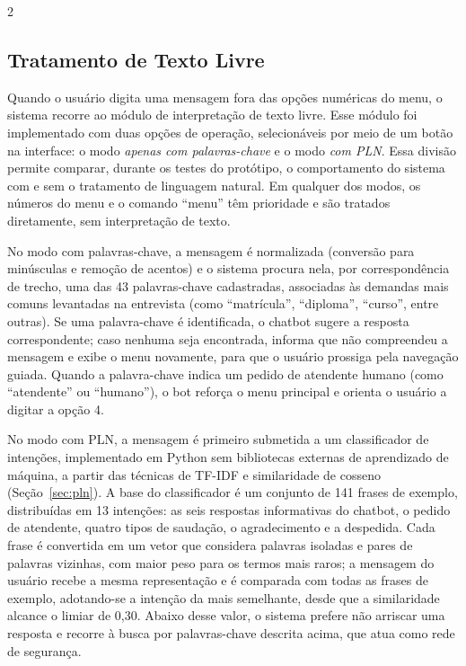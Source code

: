 \documentclass[10pt]{article}
\begin{document}
\begin{multicols}{2}


\subsection{Tratamento de Texto Livre}\label{sec:textolivre}

Quando o usuário digita uma mensagem fora das opções numéricas do menu, o
sistema recorre ao módulo de interpretação de texto livre. Esse módulo foi
implementado com duas opções de operação, selecionáveis por meio de um
botão na interface: o modo \textit{apenas com palavras-chave} e o modo
\textit{com PLN}. Essa divisão permite comparar, durante os testes do
protótipo, o comportamento do sistema com e sem o tratamento de linguagem
natural. Em qualquer dos modos, os números do menu e o comando ``menu'' têm
prioridade e são tratados diretamente, sem interpretação de texto.

No modo com palavras-chave, a mensagem é normalizada (conversão para
minúsculas e remoção de acentos) e o sistema procura nela, por
correspondência de trecho, uma das 43 palavras-chave cadastradas,
associadas às demandas mais comuns levantadas na entrevista (como
``matrícula'', ``diploma'', ``curso'', entre outras). Se uma palavra-chave é
identificada, o chatbot sugere a resposta correspondente; caso nenhuma
seja encontrada, informa que não compreendeu a mensagem e exibe o menu
novamente, para que o usuário prossiga pela navegação guiada. Quando a
palavra-chave indica um pedido de atendente humano (como ``atendente'' ou
``humano''), o bot reforça o menu principal e orienta o usuário a digitar a
opção 4.

No modo com PLN, a mensagem é primeiro submetida a um classificador de
intenções, implementado em Python sem bibliotecas externas de aprendizado
de máquina, a partir das técnicas de TF-IDF e similaridade de cosseno
(Seção~\ref{sec:pln}). A base do classificador é um conjunto de 141 frases
de exemplo, distribuídas em 13 intenções: as seis respostas informativas
do chatbot, o pedido de atendente, quatro tipos de saudação, o
agradecimento e a despedida. Cada frase é convertida em um vetor que
considera palavras isoladas e pares de palavras vizinhas, com maior peso
para os termos mais raros; a mensagem do usuário recebe a mesma
representação e é comparada com todas as frases de exemplo, adotando-se a
intenção da mais semelhante, desde que a similaridade alcance o limiar de
0,30. Abaixo desse valor, o sistema prefere não arriscar uma resposta e
recorre à busca por palavras-chave descrita acima, que atua como rede de
segurança.


\end{multicols}
\end{document}
